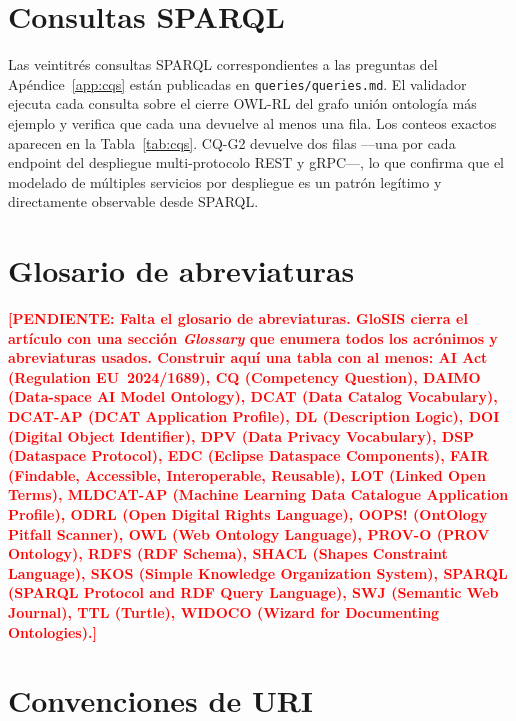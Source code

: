 \documentclass[11pt,a4paper]{article}
\newcommand{\code}[1]{\texttt{#1}}
\newcommand{\TODO}[1]{\textcolor{red}{\textbf{[PENDIENTE: #1]}}}
\begin{document}
\section{Consultas SPARQL}\label{app:sparql}

Las veintitrés consultas SPARQL correspondientes a las preguntas del Apéndice~\ref{app:cqs} están publicadas en \code{queries/queries.md}. El validador ejecuta cada consulta sobre el cierre OWL-RL del grafo unión ontología más ejemplo y verifica que cada una devuelve al menos una fila. Los conteos exactos aparecen en la Tabla~\ref{tab:cqs}. CQ-G2 devuelve dos filas ---una por cada endpoint del despliegue multi-protocolo REST y gRPC---, lo que confirma que el modelado de múltiples servicios por despliegue es un patrón legítimo y directamente observable desde SPARQL.

\section{Glosario de abreviaturas}\label{app:glossary}

\TODO{Falta el glosario de abreviaturas. GloSIS cierra el artículo con una sección \emph{Glossary} que enumera todos los acrónimos y abreviaturas usados. Construir aquí una tabla con al menos: \textbf{AI Act} (Regulation EU~2024/1689), \textbf{CQ} (Competency Question), \textbf{DAIMO} (Data-space AI Model Ontology), \textbf{DCAT} (Data Catalog Vocabulary), \textbf{DCAT-AP} (DCAT Application Profile), \textbf{DL} (Description Logic), \textbf{DOI} (Digital Object Identifier), \textbf{DPV} (Data Privacy Vocabulary), \textbf{DSP} (Dataspace Protocol), \textbf{EDC} (Eclipse Dataspace Components), \textbf{FAIR} (Findable, Accessible, Interoperable, Reusable), \textbf{LOT} (Linked Open Terms), \textbf{MLDCAT-AP} (Machine Learning Data Catalogue Application Profile), \textbf{ODRL} (Open Digital Rights Language), \textbf{OOPS!} (OntOlogy Pitfall Scanner), \textbf{OWL} (Web Ontology Language), \textbf{PROV-O} (PROV Ontology), \textbf{RDFS} (RDF Schema), \textbf{SHACL} (Shapes Constraint Language), \textbf{SKOS} (Simple Knowledge Organization System), \textbf{SPARQL} (SPARQL Protocol and RDF Query Language), \textbf{SWJ} (Semantic Web Journal), \textbf{TTL} (Turtle), \textbf{WIDOCO} (Wizard for Documenting Ontologies).}

\section{Convenciones de URI}\label{app:uris}
\end{document}
